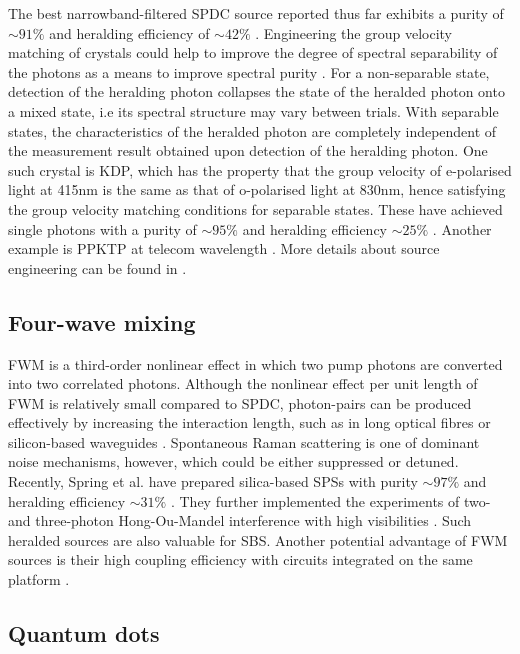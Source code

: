 \documentclass[aps,rmp,twocolumn,amsmath,amssymb,nofootinbib,superscriptaddress]{revtex4}
\begin{document}
The best narrowband-filtered SPDC source reported thus far exhibits a purity of \mbox{$\sim 91\%$} and heralding efficiency of \mbox{$\sim 42\%$} \cite{bib:54}. Engineering the group velocity matching of crystals could help to improve the degree of spectral separability of the photons as a means to improve spectral purity \cite{bib:55, bib:56}. For a non-separable state, detection of the heralding photon collapses the state of the heralded photon onto a mixed state, i.e its spectral structure may vary between trials. With separable states, the characteristics of the heralded photon are completely independent of the measurement result obtained upon detection of the heralding photon. One such crystal is KDP, which has the property that the group velocity of e-polarised light at 415nm is the same as that of o-polarised light at 830nm, hence satisfying the group velocity matching conditions for separable states. These have achieved single photons with a purity of \mbox{$\sim 95\%$} and heralding efficiency \mbox{$\sim 25\%$} \cite{bib:56}. Another example is PPKTP at telecom wavelength \cite{bib:57}. More details about source engineering can be found in \cite{bib:58, bib:59, bib:60}.

\subsection{Four-wave mixing}

FWM is a third-order nonlinear effect in which two pump photons are converted into two correlated photons. Although the nonlinear effect per unit length of FWM is relatively small compared to SPDC, photon-pairs can be produced effectively by increasing the interaction length, such as in long optical fibres \cite{bib:45, bib:46} or silicon-based waveguides \cite{bib:43, bib:44}. Spontaneous Raman scattering is one of dominant noise mechanisms, however, which could be either suppressed or detuned. Recently, Spring et al. have prepared silica-based SPSs with purity \mbox{$\sim 97\%$} and heralding efficiency \mbox{$\sim 31\%$} \cite{bib:44}. They further implemented the experiments of two- and three-photon Hong-Ou-Mandel interference with high visibilities \cite{bib:44}. Such heralded sources are also valuable for SBS. Another potential advantage of FWM sources is their high coupling efficiency with circuits integrated on the same platform \cite{bib:43, bib:44}.

\subsection{Quantum dots}
\end{document}
